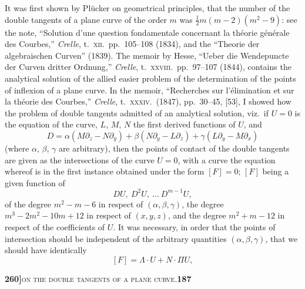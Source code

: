 \documentclass[11pt]{article}
\begin{document}
\medskip


\bigskip

\noindent It was first shown by Pl\"ucker on geometrical principles, that the number of the double tangents of a plane curve of the order $m$ was $\tfrac{1}{2}m(m-2)(m^2-9)$: see the note, ``Solution d'une question fondamentale concernant la th\'eorie g\'en\'erale des Courbes,'' \textit{Crelle}, t.~\textsc{xii}.~pp.~105--108 (1834), and the ``Theorie der algebraischen Curven'' (1839). The memoir by Hesse, ``Ueber die Wendepuncte der Curven dritter Ordnung,'' \textit{Crelle}, t.~\textsc{xxviii}.~pp.~97--107 (1844), contains the analytical solution of the allied easier problem of the determination of the points of inflexion of a plane curve. In the memoir, ``Recherches sur l'\'elimination et sur la th\'eorie des Courbes,'' \textit{Crelle}, t.~\textsc{xxxiv}.~(1847), pp.~30--45, [53], I showed how the problem of double tangents admitted of an analytical solution, viz.\ if $U = 0$ is the equation of the curve, $L$, $M$, $N$ the first derived functions of $U$, and
\[
D = \alpha(M\partial_z - N\partial_y) + \beta(N\partial_y - L\partial_z) + \gamma(L\partial_y - M\partial_x)
\]
(where $\alpha$, $\beta$, $\gamma$ are arbitrary), then the points of contact of the double tangents are given as the intersections of the curve $U = 0$, with a curve the equation whereof is in the first instance obtained under the form $[F] = 0$; $[F]$ being a given function of
\[
DU,\ D^2U,\ \ldots\ D^{m-1}U,
\]
of the degree $m^2 - m - 6$ in respect of $(\alpha, \beta, \gamma)$, the degree $m^3 - 2m^2 - 10m + 12$ in respect of $(x, y, z)$, and the degree $m^2 + m - 12$ in respect of the coefficients of $U$. It was necessary, in order that the points of intersection should be independent of the arbitrary quantities $(\alpha, \beta, \gamma)$, that we should have identically
\[
[F] = \Lambda \cdot U + N \cdot \Pi U,
\]

\newpage

\noindent\textbf{260]}\hfill\textsc{on the double tangents of a plane curve.}\hfill\textbf{187}

\medskip
\end{document}
